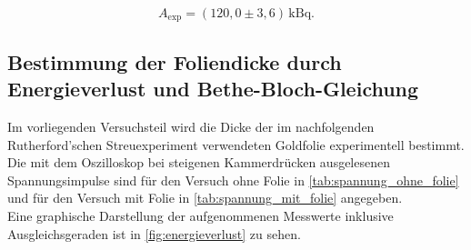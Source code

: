 \[
A_{\mathrm{exp}} = (120{,}0 \pm 3{,}6)\,\mathrm{kBq}.
\]











\subsection{Bestimmung der Foliendicke durch Energieverlust und Bethe-Bloch-Gleichung}
\label{subsec:dicke}

Im vorliegenden Versuchsteil wird die Dicke der im nachfolgenden Rutherford'schen Streuexperiment verwendeten Goldfolie experimentell bestimmt.\\
Die mit dem Oszilloskop bei steigenen Kammerdrücken ausgelesenen Spannungsimpulse sind für den Versuch ohne Folie in \autoref{tab:spannung_ohne_folie}
und für den Versuch mit Folie in \autoref{tab:spannung_mit_folie} angegeben.\\
Eine graphische Darstellung der aufgenommenen Messwerte inklusive Ausgleichsgeraden ist in \autoref{fig:energieverlust} zu sehen.\\



\begin{table}[htbp]
    \centering
    \caption{Spannungsimpulse in Abhängigkeit vom Kammerdruck ohne Folie.}
    \label{tab:spannung_ohne_folie}
\end{table}


